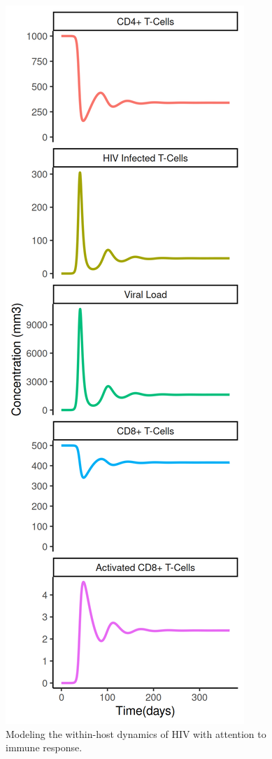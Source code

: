 \documentclass[letterpaper, 11 pt, conference]{ieeeconf}
\begin{document}
\begin{figure}[thpb]       
      \centering
      \includegraphics[scale = .5]{Images/result_ocm_1col.png}
      \caption{Modeling the within-host dynamics of HIV with attention to immune response.}
      \label{figure 3}
\end{figure}
\end{document}
